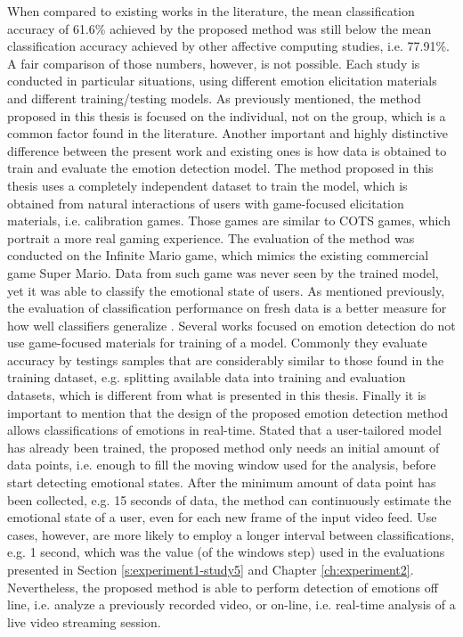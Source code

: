 When compared to existing works in the literature, the mean classification accuracy of 61.6\% achieved by the proposed method was still below the mean classification accuracy achieved by other affective computing studies, i.e. 77.91\%. A fair comparison of those numbers, however, is not possible. Each study is conducted in particular situations, using different emotion elicitation materials and different training/testing models. As previously mentioned, the method proposed in this thesis is focused on the individual, not on the group, which is a common factor found in the literature. Another important and highly distinctive difference between the present work and existing ones is how data is obtained to train and evaluate the emotion detection model. The method proposed in this thesis uses a completely independent dataset to train the model, which is obtained from natural interactions of users with game-focused elicitation materials, i.e. calibration games. Those games are similar to COTS games, which portrait a more real gaming experience. The evaluation of the method was conducted on the Infinite Mario game, which mimics the existing commercial game Super Mario. Data from such game was never seen by the trained model, yet it was able to classify the emotional state of users. As mentioned previously, the evaluation of classification performance on fresh data is a better measure for how well classifiers generalize \parencite[Chapter 5]{james2013introduction}. Several works focused on emotion detection do not use game-focused materials for training of a model. Commonly they evaluate accuracy by testings samples that are considerably similar to those found in the training dataset, e.g. splitting available data into training and evaluation datasets, which is different from what is presented in this thesis. Finally it is important to mention that the design of the proposed emotion detection method allows classifications of emotions in real-time. Stated that a user-tailored model has already been trained, the proposed method only needs an initial amount of data points, i.e. enough to fill the moving window used for the analysis, before start detecting emotional states. After the minimum amount of data point has been collected, e.g. 15 seconds of data, the method can continuously estimate the emotional state of a user, even for each new frame of the input video feed. Use cases, however, are more likely to employ a longer interval between classifications, e.g. 1 second, which was the value (of the windows step) used in the evaluations presented in Section \ref{s:experiment1-study5} and Chapter \ref{ch:experiment2}. Nevertheless, the proposed method is able to perform detection of emotions off line, i.e. analyze a previously recorded video, or on-line, i.e. real-time analysis of a live video streaming session.

